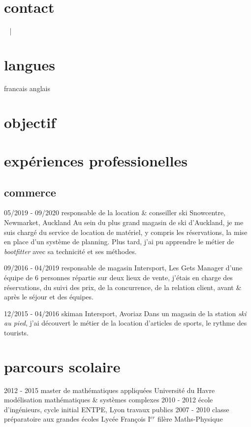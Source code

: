 \documentclass[]{farangoth-cv}
\begin{document}
\othermakeheader{}

\begin{aside}
  \section{contact}\label{sec:about}
  \myPhoneNumber{}
  ~
  \href{mailto:\myMail{}}{\myMail{}}
  \href{\myGithub}{} | \href{\myLinkedin}{}
  ~
  \myAddress{}

  \section{langues}
  francais
  anglais
\end{aside}

\section{objectif}
\lipsum[2]

\section{expériences professionelles}
\subsection{commerce}
\begin{entrylist}
  \entry%
  {05/2019 \-- 09/2020}
  {responsable de la location \& conseiller ski}
  {Snowcentre, Newmarket, Auckland}
  {
    Au sein du plus grand magasin de ski d'Auckland, je me suis chargé du service de location de matériel, y compris les réservations, la mise en place d'un système de planning. Plus tard, j'ai pu apprendre le métier de \emph{bootfitter} avec sa technicité et ses méthodes.
  }
  
  \entry%
  {09/2016 \-- 04/2019}
  {responsable de magasin}
  {Intersport, Les Gets}
  {
    Manager d'une équipe de 6 personnes répartie sur deux lieux de vente, j'étais en charge des réservations, du suivi des prix, de la concurrence, de la relation client, avant \& après le séjour et des équipes.
  }

  \entry%
  {12/2015 \-- 04/2016}
  {skiman}
  {Intersport, Avoriaz}
  {
    Dans un magasin de la station \emph{ski au pied}, j'ai découvert le métier de la location d'articles de sports, le rythme des tourists.
  }
\end{entrylist}

\section{parcours scolaire}
\begin{entrylist}
  \entry%
  {2012 \-- 2015}
  {master de mathématiques appliquées}
  {Université du Havre}
  {
    modélisation mathématiques \& systèmes complexes
  }
  \entry%
  {2010 \-- 2012}
  {école d'ingénieurs, cycle initial}
  {ENTPE, Lyon}
  {
    travaux publics
  }
  \entry%
  {2007 \-- 2010}
  {classe préparatoire aux grandes écoles}
  {Lycée François I$^{er}$}
  {
    filère Maths\--Physique
  }
\end{entrylist}
\end{document}
